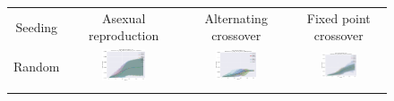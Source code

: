 \documentclass{article}
\begin{document}
\begin{landscape}
\begin{figure}[t]
\begin{center}
\begin{tabular}{c c c c}
    Seeding & Asexual reproduction & Alternating crossover & Fixed point crossover \\
    Random & \includegraphics[align=c,width=0.42\textwidth]{cc/e2/1} & \includegraphics[align=c,width=0.42\textwidth]{cc/e2/2} & \includegraphics[align=c,width=0.42\textwidth]{cc/e2/3} \\
    & & & \\

\end{tabular}
\end{center}
\end{figure}
\end{landscape}
\end{document}
